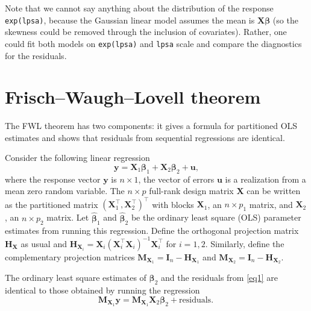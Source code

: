 \documentclass[]{book}
\theoremstyle{definition}
\theoremstyle{definition}
\theoremstyle{definition}
\theoremstyle{remark}
\let\BeginKnitrBlock\begin \let\EndKnitrBlock\end
\begin{document}
Note that we cannot say anything about the distribution of the response
\texttt{exp(lpsa)}, because the Gaussian linear model assumes the mean
is \(\mathbf{X}\boldsymbol{\beta}\) (so the skewness could be removed
through the inclusion of covariates). Rather, one could fit both models
on \texttt{exp(lpsa)} and \texttt{lpsa} scale and compare the
diagnostics for the residuals.

\hypertarget{frischwaughlovell-theorem}{%
\chapter{Frisch--Waugh--Lovell
theorem}\label{frischwaughlovell-theorem}}

The FWL theorem has two components: it gives a formula for partitioned
OLS estimates and shows that residuals from sequential regressions are
identical.

Consider the following linear regression \[
 {\boldsymbol{y}}= \mathbf{X}_1\boldsymbol{\beta}_1+\mathbf{X}_2\boldsymbol{\beta}_2+ \boldsymbol{u}, \label{eq1}
\] where the response vector \({\boldsymbol{y}}\) is \(n \times 1\), the
vector of errors \(\boldsymbol{u}\) is a realization from a mean zero
random variable. The \(n \times p\) full-rank design matrix
\(\mathbf{X}\) can be written as the partitioned matrix
\((\mathbf{X}_1^\top, \mathbf{X}_2^\top)^\top\) with blocks
\(\mathbf{X}_1\), an \(n \times p_1\) matrix, and \(\mathbf{X}_2\), an
\(n \times p_2\) matrix. Let \(\hat{\boldsymbol{\beta}}_1\) and
\(\hat{\boldsymbol{\beta}}_2\) be the ordinary least square (OLS)
parameter estimates from running this regression. Define the orthogonal
projection matrix \(\mathbf{H}_\mathbf{X}\) as usual and
\(\mathbf{H}_{\mathbf{X}_i} = \mathbf{X}_i(\mathbf{X}_i^\top\mathbf{X}_i)^{-1}\mathbf{X}_i^\top\)
for \(i=1, 2\). Similarly, define the complementary projection matrices
\(\mathbf{M}_{\mathbf{X}_1}=\mathbf{I}_n-\mathbf{H}_{\mathbf{X}_1}\) and
\(\mathbf{M}_{\mathbf{X}_2}=\mathbf{I}_n-\mathbf{H}_{\mathbf{X}_2}\).

\BeginKnitrBlock{theorem}
\protect\hypertarget{thm:unnamed-chunk-13}{}{\label{thm:unnamed-chunk-13}
}The ordinary least square estimates of \(\boldsymbol{\beta}_2\) and the
residuals from \eqref{eq1} are identical to those obtained by running
the regression \[
 \mathbf{M}_{\mathbf{X}_1}{\boldsymbol{y}}= \mathbf{M}_{\mathbf{X}_1}\mathbf{X}_2\boldsymbol{\beta}_2 + \text{residuals}. \label{eq2} \
\]
\EndKnitrBlock{theorem}
\end{document}
